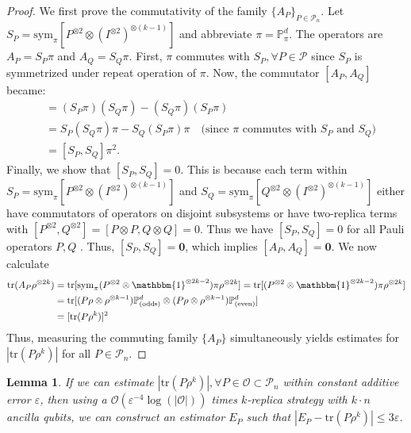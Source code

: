\documentclass[aps,%
twocolumn,%
floatfix,%
pra,%
amsfonts,%
groupedaddress,%
superscriptaddress]{revtex4-2}%
\newtheorem{lemma}{Lemma}
\newcommand{\1}{\mathbbm{1}}
\begin{document}
    \begin{proof}
    We first prove the commutativity of the family $\{A_P\}_{P \in \mathcal{P}_n}$.
    Let $S_P = \mathrm{sym}_{\pi}\left[P^{\otimes 2} \otimes (I^{\otimes 2})^{\otimes (k-1)} \right]$ and abbreviate $\pi = \mathbb{P}^d_{\pi}$. The operators are $A_P = S_P \pi$ and $A_Q = S_Q \pi$. First, $\pi$ commutes with $S_P, \forall P \in \mathcal{P}$ since $S_P$ is symmetrized under repeat operation of $\pi$.
    Now, the commutator $[A_P, A_Q]$ became:
    \begin{align}
        [A_P, A_Q] &= (S_P \pi) (S_Q \pi) - (S_Q \pi) (S_P \pi) \\
        &= S_P (S_Q \pi) \pi - S_Q (S_P \pi) \pi \quad \text{(since $\pi$ commutes with $S_P$ and $S_Q$)} \\
        &= [S_P, S_Q]\pi^2.
    \end{align}
    Finally, we show that $[S_P, S_Q] = 0$. This is because each term within $S_P = \mathrm{sym}_{\pi}\left[P^{\otimes 2} \otimes (I^{\otimes 2})^{\otimes (k-1)} \right]$ and $S_Q = \mathrm{sym}_{\pi}\left[Q^{\otimes 2} \otimes (I^{\otimes 2})^{\otimes (k-1)} \right]$
    either have commutators of operators on disjoint subsystems or have two-replica terms with $[P^{\otimes 2}, Q^{\otimes 2}] = [P \otimes P, Q \otimes Q] = 0$.
    Thus we have $[S_P, S_Q] = 0$ for all Pauli operators $P, Q$ .
    Thus, $[S_P, S_Q] = \mathbf{0}$, which implies $[A_P, A_Q] = \mathbf{0}$.
    We now calculate 
    \begin{align}
        \mathrm{tr}(A_P \rho^{\otimes 2k}) &= \mathrm{tr}[\mathrm{sym}_{\pi}(P^{\otimes 2} \otimes \1^{\otimes 2k-2}) \pi \rho^{\otimes 2k}] = \mathrm{tr}[(P^{\otimes 2} \otimes \1^{\otimes 2k-2}) \pi \rho^{\otimes 2k}]\\
        &=\mathrm{tr}[(P\rho \otimes \rho^{\otimes k-1}) \mathbb{P}^{d}_{(\mathrm{odds})} \otimes (P\rho \otimes \rho^{\otimes k-1}) \mathbb{P}^{d}_{(\mathrm{even})}]\\
        &=[\mathrm{tr}(P\rho^k)]^2
    \end{align}
    Thus, measuring the commuting family $\{A_P\}$ simultaneously yields estimates for $|\mathrm{tr}(P\rho^k)|$ for all $P \in \mathcal{P}_n$.
    \end{proof}
\begin{lemma}
    \label{lemma:signal_estim}
    If we can estimate $|\mathrm{tr}(P \rho^k)|, \forall P \in \mathcal{O} \subset \mathcal{P}_n$ within constant additive error $\varepsilon$, then using a $\mathcal{O}(\varepsilon^{-4}\log(|\mathcal{O}|))$ times $k$-replica strategy with $k \cdot n$ ancilla qubits, we can construct an estimator $E_P$ such that $|E_P - \mathrm{tr}(P \rho^{k})| \leq 3\varepsilon$. 
\end{lemma}
\end{document}
